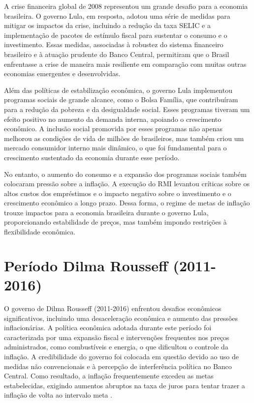 \documentclass[12pt,oneside,a4paper,chapter=TITLE,english,brazil,sumario=abnt-6027-2012]{abntex2}
\begin{document}
A crise financeira global de 2008 representou um grande desafio para a economia brasileira. O governo Lula, em resposta, adotou uma série de medidas para mitigar os impactos da crise, incluindo a redução da taxa SELIC e a implementação de pacotes de estímulo fiscal para sustentar o consumo e o investimento. Essas medidas, associadas à robustez do sistema financeiro brasileiro e à atuação prudente do Banco Central, permitiram que o Brasil enfrentasse a crise de maneira mais resiliente em comparação com muitas outras economias emergentes e desenvolvidas.

Além das políticas de estabilização econômica, o governo Lula implementou programas sociais de grande alcance, como o Bolsa Família, que contribuíram para a redução da pobreza e da desigualdade social. Esses programas tiveram um efeito positivo no aumento da demanda interna, apoiando o crescimento econômico. A inclusão social promovida por esses programas não apenas melhorou as condições de vida de milhões de brasileiros, mas também criou um mercado consumidor interno mais dinâmico, o que foi fundamental para o crescimento sustentado da economia durante esse período.

No entanto, o aumento do consumo e a expansão dos programas sociais também colocaram pressão sobre a inflação. A execução do RMI levantou críticas sobre os altos custos dos empréstimos e o impacto negativo sobre o investimento e o crescimento econômico a longo prazo. Dessa forma, o regime de metas de inflação trouxe impactos para a economia brasileira durante o governo Lula, proporcionando estabilidade de preços, mas também impondo restrições à flexibilidade econômica.

\section{Período Dilma Rousseff (2011-2016)}
O governo de Dilma Rousseff (2011-2016) enfrentou desafios econômicos significativos, incluindo uma desaceleração econômica e aumento das pressões inflacionárias. A política econômica adotada durante este período foi caracterizada por uma expansão fiscal e intervenções frequentes nos preços administrados, como combustíveis e energia, o que dificultou o controle da inflação. A credibilidade do governo foi colocada em questão devido ao uso de medidas não convencionais e à percepção de interferência política no Banco Central. Como resultado, a inflação frequentemente excedeu as metas estabelecidas, exigindo aumentos abruptos na taxa de juros para tentar trazer a inflação de volta ao intervalo meta \cite{carvalho_2016_growth}.
\end{document}
